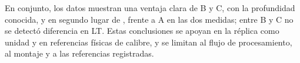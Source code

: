 En conjunto, los datos muestran una ventaja clara de B y C, con la profundidad conocida, y en segundo lugar de \Aprime, frente a A en las dos medidas; entre B y C no se detectó diferencia en LT. Estas conclusiones se apoyan en la réplica como unidad y en referencias físicas de calibre, y se limitan al flujo de procesamiento, al montaje y a las referencias registradas.
